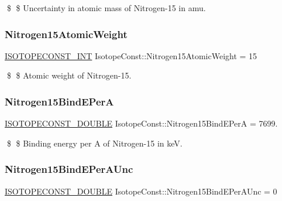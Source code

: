 \$ \$ Uncertainty in atomic mass of Nitrogen-\/15 in amu. \mbox{\label{group___isotope_const-_nitrogen-_n15_ga8006e4f6966fe97819aaddab747fb7fd}} 
\subsubsection{\texorpdfstring{Nitrogen15\+Atomic\+Weight}{Nitrogen15AtomicWeight}}
{\footnotesize\ttfamily \mbox{\hyperlink{group___isotope_const-_macros_ga5f18360b3e99483a35c32d789e62621c}{I\+S\+O\+T\+O\+P\+E\+C\+O\+N\+S\+T\+\_\+\+I\+NT}} Isotope\+Const\+::\+Nitrogen15\+Atomic\+Weight = 15}

\$ \$ Atomic weight of Nitrogen-\/15. \mbox{\label{group___isotope_const-_nitrogen-_n15_gaa9c9fc6e954f57b64b8a383eb0a4d784}} 
\subsubsection{\texorpdfstring{Nitrogen15\+Bind\+E\+PerA}{Nitrogen15BindEPerA}}
{\footnotesize\ttfamily \mbox{\hyperlink{group___isotope_const-_macros_ga8f45a7272ce02c0b4c65c44636ed719a}{I\+S\+O\+T\+O\+P\+E\+C\+O\+N\+S\+T\+\_\+\+D\+O\+U\+B\+LE}} Isotope\+Const\+::\+Nitrogen15\+Bind\+E\+PerA = 7699.}

\$ \$ Binding energy per A of Nitrogen-\/15 in keV. \mbox{\label{group___isotope_const-_nitrogen-_n15_gad23f63fd48b9c717ec702bb9eb48e063}} 
\subsubsection{\texorpdfstring{Nitrogen15\+Bind\+E\+Per\+A\+Unc}{Nitrogen15BindEPerAUnc}}
{\footnotesize\ttfamily \mbox{\hyperlink{group___isotope_const-_macros_ga8f45a7272ce02c0b4c65c44636ed719a}{I\+S\+O\+T\+O\+P\+E\+C\+O\+N\+S\+T\+\_\+\+D\+O\+U\+B\+LE}} Isotope\+Const\+::\+Nitrogen15\+Bind\+E\+Per\+A\+Unc = 0}

